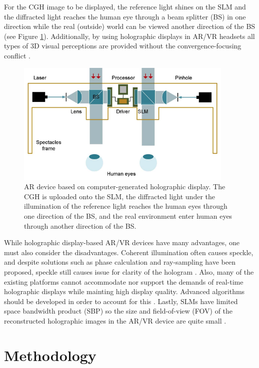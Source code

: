 \documentclass[12pt]{article}
\begin{document}
For the CGH image to be displayed, the reference light shines on the SLM and the diffracted light reaches the human eye through a beam splitter (BS) in one direction while the real (outside) world can be viewed another direction of the BS \cite{he2019progress} (see Figure \ref{fig:14}).
Additionally, by using holographic displays in AR/VR headsets all types of 3D visual perceptions are provided without the convergence-focusing conflict \cite{he2019progress}.

\begin{figure}[H]
    \centering
    \includegraphics[width=.7\textwidth]{holo vrar.png}
    \caption{\centering AR device based on computer-generated holographic display. The CGH is uploaded onto the SLM, the diffracted light under the illumination of the reference light reaches
    the human eyes through one direction of the BS, and the real environment enter human eyes through another direction of the BS. \protect\cite{he2019progress}}
    \label{fig:14}
\end{figure}

While holographic display-based AR/VR devices have many advantages, one must also consider the disadvantages. Coherent illumination often causes speckle, and despite solutions such as phase calculation and ray-sampling have been proposed, speckle still causes issue for clarity of the hologram \cite{he2019progress}.
Also, many of the existing platforms cannot accommodate nor support the demands of real-time holographic displays while mainting high display quality. Advanced algorithms should be developed in order to account for this \cite{he2019progress}.
Lastly, SLMs have limited space bandwidth product (SBP) so the size and field-of-view (FOV) of the reconstructed holographic images in the AR/VR device are quite small \cite{he2019progress}.

\section{Methodology} \label{sec:2}
\end{document}
